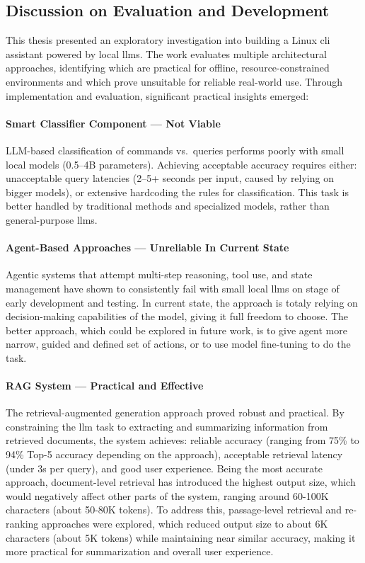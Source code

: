 \subsection{Discussion on Evaluation and Development}

This thesis presented an exploratory investigation into building a Linux
\gls{cli} assistant powered by local \glspl{llm}. The work evaluates multiple
architectural approaches, identifying which are practical for offline,
resource-constrained environments and which prove unsuitable for reliable
real-world use. Through implementation and evaluation, significant practical insights emerged:

\paragraph{Smart Classifier Component --- Not Viable}
LLM-based classification of commands vs.\ queries performs poorly with small
local models (0.5--4B parameters). Achieving acceptable accuracy requires
either: unacceptable query latencies (2--5+ seconds per input, caused by relying
on bigger models), or extensive hardcoding the rules for classification. This
task is better handled by traditional methods and specialized models, rather
than general-purpose \glspl{llm}.

\paragraph{Agent-Based Approaches --- Unreliable In Current State}
Agentic systems that attempt multi-step reasoning, tool use, and state
management  have shown to consistently fail with small local \glspl{llm} on
stage of early development and testing. In current state, the approach is totaly
relying on decision-making capabilities of the model, giving it full freedom to
choose. The better approach, which could be explored in future work, is to give
agent more narrow, guided and defined set of actions, or to use model
fine-tuning to do the task.

\paragraph{RAG System --- Practical and Effective}
The retrieval-augmented generation approach proved robust and practical. By
constraining the \gls{llm} task to extracting and summarizing information from
retrieved documents, the system achieves: reliable accuracy (ranging from 75\%
to 94\% Top-5 accuracy depending on the approach), acceptable retrieval latency (under 3s
per query), and good user experience. Being the most accurate approach,
document-level retrieval has introduced the highest output size, which would
negatively affect other parts of the system, ranging around 60-100K characters
(about 50-80K tokens). To address this, passage-level retrieval and re-ranking
approaches were explored, which reduced output size to about 6K characters
(about 5K tokens) while maintaining near similar accuracy, making it more
practical for summarization and overall user experience.


